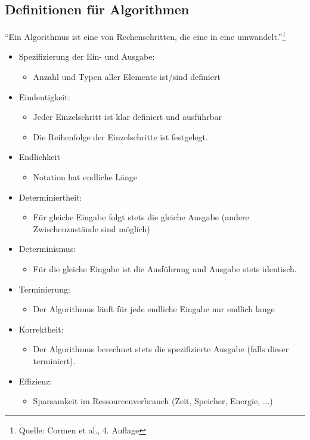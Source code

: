 \documentclass[
    12pt,
    a4paper,
    ngerman,
    color=3b,%
    marginpar=false,
    colorback=false,
    leqno,
]{tudaexercise}
\begin{document}
\subsection{Definitionen für Algorithmen}\label{1.2}\label{Definitionen fuer Algorithmen}
"`Ein Algorithmus ist eine  von Rechenschritten, die eine  in eine  umwandelt."'\footnote{Quelle: Cormen et al., 4. Auflage}\\
\begin{itemize}
    \item Spezifizierung der Ein- und Ausgabe:\begin{itemize}
              \item Anzahl und Typen aller Elemente ist/sind definiert
          \end{itemize}
    \item Eindeutigkeit:\begin{itemize}
              \item Jeder Einzelschritt ist klar definiert und ausführbar
              \item Die Reihenfolge der Einzelschritte ist festgelegt.
          \end{itemize}
    \item Endlichkeit\begin{itemize}
              \item Notation hat endliche Länge
          \end{itemize}
\end{itemize}
\begin{itemize}
    \item Determiniertheit:\begin{itemize}
              \item Für gleiche Eingabe folgt stets die gleiche Ausgabe (andere Zwischenzustände sind möglich)
          \end{itemize}
    \item Determinismus:\begin{itemize}
              \item Für die gleiche Eingabe ist die Ausführung und Ausgabe stets identisch.
          \end{itemize}
    \item Terminierung:\begin{itemize}
              \item Der Algorithmus läuft für jede endliche Eingabe nur endlich lange
          \end{itemize}
    \item Korrektheit:\begin{itemize}
              \item Der Algorithmus berechnet stets die spezifizierte Ausgabe (falls dieser
                    terminiert).
          \end{itemize}
    \item Effizienz:\begin{itemize}
              \item Sparsamkeit im Ressourcenverbrauch (Zeit, Speicher, Energie, ...)
          \end{itemize}
\end{itemize}
\end{document}
